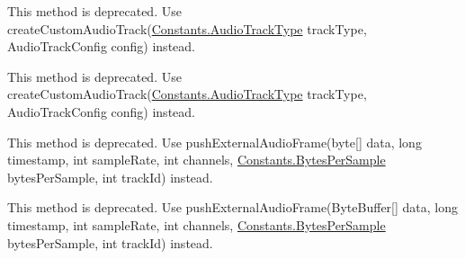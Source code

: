 \begin{DoxyRefList}
\item[Member \mbox{\hyperlink{classio_1_1agora_1_1rtc2_1_1_rtc_engine_aab202ce0e42ee7e6674d04da41052541}{io.agora.rtc2.Rtc\+Engine.set\+External\+Audio\+Source}} (boolean enabled, int sample\+Rate, int channels)]\label{deprecated__deprecated000023}%
%
This method is deprecated. Use create\+Custom\+Audio\+Track(\mbox{\hyperlink{enumio_1_1agora_1_1rtc2_1_1_constants_1_1_audio_track_type}{Constants.\+Audio\+Track\+Type}} track\+Type, Audio\+Track\+Config config) instead. 
\item[Member \mbox{\hyperlink{classio_1_1agora_1_1rtc2_1_1_rtc_engine_a0448dfe93f92836b8c9724b1a3f9227b}{io.agora.rtc2.Rtc\+Engine.set\+External\+Audio\+Source}} (boolean enabled, int sample\+Rate, int channels, boolean local\+Playback, boolean publish)]\label{deprecated__deprecated000024}%
%
This method is deprecated. Use create\+Custom\+Audio\+Track(\mbox{\hyperlink{enumio_1_1agora_1_1rtc2_1_1_constants_1_1_audio_track_type}{Constants.\+Audio\+Track\+Type}} track\+Type, Audio\+Track\+Config config) instead.  
\item[Member \mbox{\hyperlink{classio_1_1agora_1_1rtc2_1_1_rtc_engine_a7d3fb043b5e6110aaf1dbb79bdf1e443}{io.agora.rtc2.Rtc\+Engine.push\+External\+Audio\+Frame}} (byte\mbox{[}\mbox{]} data, long timestamp)]\label{deprecated__deprecated000025}%
%
This method is deprecated. Use push\+External\+Audio\+Frame(byte\mbox{[}\mbox{]} data, long timestamp, int sample\+Rate, int channels, \mbox{\hyperlink{enumio_1_1agora_1_1rtc2_1_1_constants_1_1_bytes_per_sample}{Constants.\+Bytes\+Per\+Sample}} bytes\+Per\+Sample, int track\+Id) instead. 
\item[Member \mbox{\hyperlink{classio_1_1agora_1_1rtc2_1_1_rtc_engine_a9f0b6f1a4844846a681557f51e22c262}{io.agora.rtc2.Rtc\+Engine.push\+External\+Audio\+Frame}} (Byte\+Buffer data, long timestamp, int track\+Id)]\label{deprecated__deprecated000026}%
%
This method is deprecated. Use push\+External\+Audio\+Frame(Byte\+Buffer\mbox{[}\mbox{]} data, long timestamp, int sample\+Rate, int channels, \mbox{\hyperlink{enumio_1_1agora_1_1rtc2_1_1_constants_1_1_bytes_per_sample}{Constants.\+Bytes\+Per\+Sample}} bytes\+Per\+Sample, int track\+Id) instead. 
\item[Member \mbox{\hyperlink{classio_1_1agora_1_1rtc2_1_1_rtc_engine_a2e84e4ede445e1b024bf3836fae61d26}{io.agora.rtc2.Rtc\+Engine.push\+External\+Video\+Frame}} (Video\+Frame frame)]\label{deprecated__deprecated000027}%

\end{DoxyRefList}
